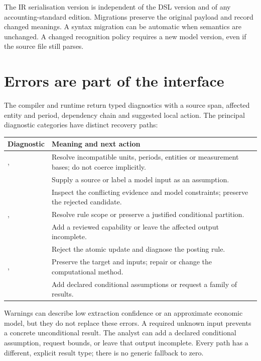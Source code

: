 The IR serialisation version is independent of the DSL version and of any
accounting-standard edition. Migrations preserve the original payload and
record changed meanings. A syntax migration can be automatic when semantics
are unchanged. A changed recognition policy requires a new model version,
even if the source file still parses.

\begin{minipage}{\linewidth}
\section{Errors are part of the interface}

The compiler and runtime return typed diagnostics with a source span,
affected entity and period, dependency chain and suggested local action.
The principal diagnostic categories have distinct recovery paths:

\begin{center}
\begin{tabular}{L{61mm}L{75mm}}
\toprule Diagnostic & Meaning and next action\\\midrule
{},  & Resolve incompatible units,
periods, entities or measurement bases; do not coerce implicitly.\\
 & Supply a source or label a model input as an assumption.\\
 & Inspect the conflicting evidence and model
constraints; preserve the rejected candidate.\\
,  & Resolve rule scope or
preserve a justified conditional partition.\\
 & Add a reviewed capability or leave the affected
output incomplete.\\
 & Reject the atomic update and diagnose the posting rule.\\
,  & Preserve the target and
inputs; repair or change the computational method.\\
 & Add declared conditional assumptions or
request a family of results.\\\bottomrule
\end{tabular}
\end{center}

Warnings can describe low extraction confidence or an approximate economic
model, but they do not replace these errors. A required unknown input prevents
a concrete unconditional result. The analyst can add a declared conditional
assumption, request bounds, or leave that output incomplete. Every path has a
different, explicit result type; there is no generic fallback to zero.
\end{minipage}\par
